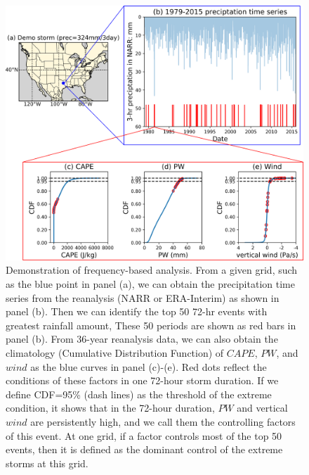 \begin{figure}[htbp]
	\includegraphics[width=\linewidth]{pics/ch4/fig2.png}
	\caption{Demonstration of frequency-based analysis. From a given grid, such as the blue point in panel (a), we can obtain the precipitation time series from the reanalysis (NARR or ERA-Interim) as shown in panel (b). Then we can identify the top 50 72-hr events with greatest rainfall amount, These 50 periods are shown as red bars in panel (b). From 36-year reanalysis data, we can also obtain the climatology (Cumulative Distribution Function) of $CAPE$, $PW$, and $wind$ as the blue curves in panel (c)-(e). Red dots reflect the conditions of these factors in one 72-hour storm duration. If we define CDF=95\% (dash lines) as the threshold of the extreme condition, it shows that in the 72-hour duration, $PW$ and vertical $wind$ are persistently high, and we call them the controlling factors of this event. At one grid, if a factor controls most of the top 50 events, then it is defined as the dominant control of the extreme storms at this grid.}
	\label{fig:4-2}
\end{figure}

